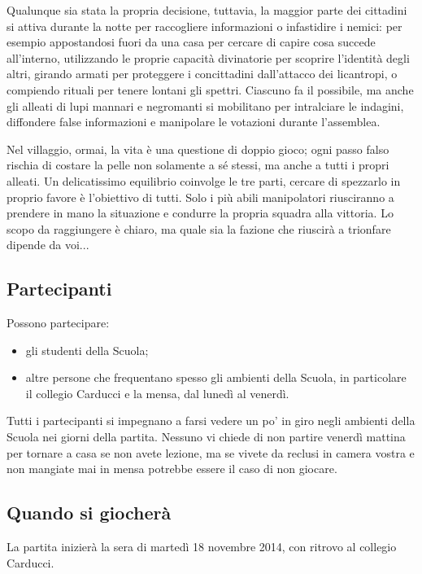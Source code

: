\documentclass[a4paper,10pt]{article}
\begin{document}
Qualunque sia stata la propria decisione, tuttavia, la maggior parte dei cittadini si attiva durante la notte per raccogliere informazioni o infastidire i nemici: per esempio appostandosi fuori da una casa per cercare di capire cosa succede all'interno, utilizzando le proprie capacità divinatorie per scoprire l'identità degli altri, girando armati per proteggere i concittadini dall'attacco dei licantropi, o compiendo rituali per tenere lontani gli spettri. Ciascuno fa il possibile, ma anche gli alleati di lupi mannari e negromanti si mobilitano per intralciare le indagini, diffondere false informazioni e manipolare le votazioni durante l'assemblea.

Nel villaggio, ormai, la vita è una questione di doppio gioco; ogni passo falso rischia di costare la pelle non solamente a sé stessi, ma anche a tutti i propri alleati. Un delicatissimo equilibrio coinvolge le tre parti, cercare di spezzarlo in proprio favore è l'obiettivo di tutti. Solo i più abili manipolatori riusciranno a prendere in mano la situazione e condurre la propria squadra alla vittoria. Lo scopo da raggiungere è chiaro, ma quale sia la fazione che riuscirà a trionfare dipende da voi...


\subsection{Partecipanti}
Possono partecipare:
\begin{itemize}
 \item gli studenti della Scuola;
 \item altre persone che frequentano spesso gli ambienti della Scuola, in particolare il collegio Carducci e la mensa, dal lunedì al venerdì.
\end{itemize}
Tutti i partecipanti si impegnano a farsi vedere un po' in giro negli ambienti della Scuola nei giorni della partita. Nessuno vi chiede di non partire venerdì mattina per tornare a casa se non avete lezione, ma se vivete da reclusi in camera vostra e non mangiate mai in mensa potrebbe essere il caso di non giocare.


\subsection{Quando si giocherà}

La partita inizierà la sera di martedì 18 novembre 2014, con ritrovo al collegio Carducci. %
\end{document}

